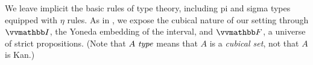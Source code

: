 \documentclass[draft]{amsart}
\begin{document}
We leave implicit the basic rules of type theory, including pi and sigma types
equipped with $\eta$ rules. As in \citep{orton-pitts:2016,abcfhl:2019}, we
expose the cubical nature of our setting through $\DIM$, the Yoneda embedding of
the interval, and $\COF$, a universe of strict propositions. (Note that
$A\ \mathit{type}$ means that $A$ is a \emph{cubical set}, not that $A$ is Kan.)

\end{document}
